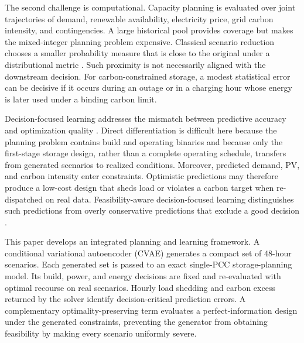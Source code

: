 \documentclass[times]{elsarticle}
\begin{document}
The second challenge is computational. Capacity planning is evaluated over
joint trajectories of demand, renewable availability, electricity price, grid
carbon intensity, and contingencies. A large historical pool provides coverage
but makes the mixed-integer planning problem expensive. Classical scenario
reduction chooses a smaller probability measure that is close to the original
under a distributional metric \cite{Dupacova2003}. Such proximity is not
necessarily aligned with the downstream decision. For carbon-constrained
storage, a modest statistical error can be decisive if it occurs during an
outage or in a charging hour whose energy is later used under a binding carbon
limit.

Decision-focused learning addresses the mismatch between predictive accuracy
and optimization quality \cite{Wilder2019}. Direct differentiation is difficult
here because the planning problem contains build and operating binaries and
because only the first-stage storage design, rather than a complete operating
schedule, transfers from generated scenarios to realized conditions. Moreover,
predicted demand, PV, and carbon intensity enter constraints. Optimistic
predictions may therefore produce a low-cost design that sheds load or violates
a carbon target when re-dispatched on real data. Feasibility-aware
decision-focused learning distinguishes such predictions from overly
conservative predictions that exclude a good decision \cite{Mandi2025}.

This paper develops an integrated planning and learning framework. A
conditional variational autoencoder (CVAE) \cite{Sohn2015} generates a compact
set of 48-hour scenarios. Each generated set is passed to an exact single-PCC
storage-planning model. Its build, power, and energy decisions are fixed and
re-evaluated with optimal recourse on real scenarios. Hourly load shedding and
carbon excess returned by the solver identify decision-critical prediction
errors. A complementary optimality-preserving term evaluates a
perfect-information design under the generated constraints, preventing the
generator from obtaining feasibility by making every scenario uniformly severe.
\end{document}
